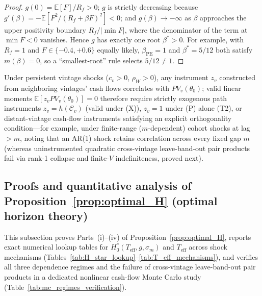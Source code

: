 \begin{proof}
$g(0) = \mathbb{E}[F]/R_f > 0$; $g$ is strictly decreasing because $g'(\beta) = -\mathbb{E}[F^2/(R_f+\beta F)^2] < 0$; and $g(\beta) \to -\infty$ as $\beta$ approaches the upper positivity boundary $R_f/|\min F|$, where the denominator of the term at $\min F < 0$ vanishes. Hence $g$ has exactly one root $\beta^\ast > 0$. For example, with $R_f = 1$ and $F \in \{-0.4, +0.6\}$ equally likely, $\beta_{\mathrm{PE}} = 1$ and $\beta^\ast = 5/12$ both satisfy $m(\beta) = 0$, so a ``smallest-root'' rule selects $5/12 \neq 1$.
\end{proof}

Under persistent vintage shocks ($c_v > 0$, $\rho_W > 0$), any instrument $z_v$ constructed from neighboring vintages' cash flows correlates with $PV_v(\theta_0)$; valid linear moments $\mathbb{E}[z_v PV_v(\theta_0)] = 0$ therefore require strictly exogenous path instruments $z_v = h(\mathcal{C}_v)$ (valid under (X)), $z_v = 1$ under (P) alone (T2), or distant-vintage cash-flow instruments satisfying an explicit orthogonality condition---for example, under finite-range ($m$-dependent) cohort shocks at lag $> m$, noting that an AR(1) shock retains correlation across every fixed gap $m$ (whereas uninstrumented quadratic cross-vintage leave-band-out pair products fail via rank-1 collapse and finite-$V$ indefiniteness, proved next).

\subsection{Proofs and quantitative analysis of Proposition~\ref{prop:optimal_H} (optimal horizon theory)}
\label{sec:appendix_optimal_H}

This subsection proves Parts~(i)--(iv) of Proposition~\ref{prop:optimal_H}, reports exact numerical lookup tables for $H_0^\ast(T_{\mathrm{eff}}, g, \sigma_m)$ and $T_{\mathrm{eff}}$ across shock mechanisms (Tables~\ref{tab:H_star_lookup}--\ref{tab:T_eff_mechanisms}), and verifies all three dependence regimes and the failure of cross-vintage leave-band-out pair products in a dedicated nonlinear cash-flow Monte Carlo study (Table~\ref{tab:mc_regimes_verification}).


